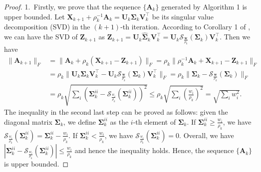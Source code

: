 \begin{proof}
1.\ Firstly, we prove that the sequence $\{\bm{A}_{k}\}$ generated by Algorithm 1 is upper bounded.
Let $\bm{X}_{k+1}+\rho_{k}^{-1}\bm{A}_{k}
=
\bm{U}_{k}\bm{\Sigma}_{k}\bm{V}_{k}^{\top}$
be its singular value decomposition (SVD) \cite{eckart1936approximation} in the $(k+1)$-th iteration. According to Corollary 1 of \cite{wnnmijcv}, we can have the SVD of $\bm{Z}_{k+1}$ as $\bm{Z}_{k+1}=\bm{U}_{k}\hat{\bm{\Sigma}}_{k}\bm{V}_{k}^{\top}=\bm{U}_{k}\mathcal{S}_{\frac{\bm{w}}{\rho_{k}}}(\bm{\Sigma}_{k})\bm{V}_{k}^{\top}$. 
Then we have 
\begin{align}
\|
\bm{A}_{k+1}
\|_{F}
&
=
\|
\bm{A}_{k}
+
\rho_{k}
(\bm{X}_{k+1}-\bm{Z}_{k+1})
\|_{F}
=
\rho_{k}\|
\rho_{k}^{-1}
\bm{A}_{k}
+
\bm{X}_{k+1}
-
\bm{Z}_{k+1}
\|_{F}
\\
&
=
\rho_{k}\|
\bm{U}_{k}\bm{\Sigma}_{k}\bm{V}_{k}^{\top}
-
\bm{U}_{k}\mathcal{S}_{\frac{\bm{w}}{\rho_{k}}}(\bm{\Sigma}_{k})\bm{V}_{k}^{\top}
\|_{F}
=
\rho_{k}\|
\bm{\Sigma}_{k}
-
\mathcal{S}_{\frac{\bm{w}}{\rho_{k}}}(\bm{\Sigma}_{k})
\|_{F}
\\
&
=
\rho_{k}
\sqrt{\sum_{i}(\bm{\Sigma}_{k}^{ii}-\mathcal{S}_{\frac{w_{i}}{\rho_{k}}}(\bm{\Sigma}_{k}^{ii}))^{2}}
\le
\rho_{k}
\sqrt{\sum_{i}(\frac{w_{i}}{\rho_{k}})^{2}}
=
\sqrt{\sum_{i}w_{i}^{2}}.
\end{align}
The inequality in the second last step can be proved as follows: given the diagonal matrix $\bm{\Sigma}_{k}$, we define $\bm{\Sigma}_{k}^{ii}$ as the $i$-th element of $\bm{\Sigma}_{k}$. If $\bm{\Sigma}_{k}^{ii}\ge\frac{w_{i}}{\rho_{k}}$, we have $\mathcal{S}_{\frac{w_{i}}{\rho_{k}}}(\bm{\Sigma}_{k}^{ii})=\bm{\Sigma}_{k}^{ii}-\frac{w_{i}}{\rho_{k}}$. If $\bm{\Sigma}_{k}^{ii}<\frac{w_{i}}{\rho_{k}}$, we have $\mathcal{S}_{\frac{w_{i}}{\rho_{k}}}(\bm{\Sigma}_{k}^{ii})=0$. Overall, we have $|\bm{\Sigma}_{k}^{ii}-\mathcal{S}_{\frac{w_{i}}{\rho_{k}}}(\bm{\Sigma}_{k}^{ii})|\le\frac{w_{i}}{\rho_{k}}$ and hence the inequality holds. Hence, the sequence $\{\bm{A}_{k}\}$ is upper bounded.


\end{proof}
